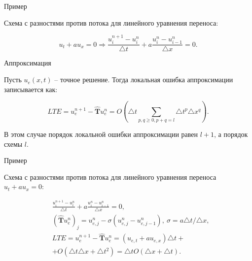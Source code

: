 \documentclass[10pt,xcolor=pst,aspectratio=169]{beamer}
\begin{document}
\begin{frame}{Пример}

    \transdissolve[duration=0.1]
    \justifying
    \large

    Схема с разностями против потока для линейного уравнения переноса:

    \[
        u_{t} + a u_{x} = 0 \Rightarrow \frac{u^{n + 1}_{i} - u^{n}_{i}}{\triangle t} + a \frac{u^{n}_{i} - u^{n}_{i - 1}}{\triangle x} = 0.
    \]    

\end{frame}

\begin{frame}{Аппроксимация}

	\transdissolve[duration=0.1]
	\justifying
	\large

	Пусть $u_{e} (x, t)$ -- точное решение. Тогда локальная ошибка аппроксимации записывается как:

	\[
		LTE = u^{n + 1}_{e} - \hat{\textbf{T}} u^{n}_{e} = O \left( \triangle t \sum_{p , q \geq 0, p + q = l} \triangle t^{p} \triangle x^{q} \right).
	\]

	В этом случае порядок локальной ошибки аппроксимации равен $l + 1$, а порядок схемы $l$.

\end{frame}

\begin{frame}{Пример}

	\transdissolve[duration=0.1]
	\justifying
	\large

	Схема с разностями против потока для линейного уравнения переноса $u_{t} + a u_{x} = 0$:

	\[
		\begin{split}
			&\frac{u^{n + 1}_{i} - u^{n}_{i}}{\triangle t} + a \frac{u^{n}_{i} - u^{n}_{i - 1}}{\triangle x} = 0, \\
			&\left( \hat{\textbf{T}} u^{n}_{e} \right)_{j} = u^{n}_{e, j} - \sigma \left( u^{n}_{e, j} - u^{n}_{e, j - 1} \right), \: \sigma = a \triangle t / \triangle x, \\
			&LTE = u^{n + 1}_{e} - \hat{\textbf{T}} u^{n}_{e} = \left( u_{e, t} + a u_{e, x} \right) \triangle t +\\
			& + O \left( \triangle t \triangle x + \triangle t^{2} \right) = \triangle t O \left( \triangle x + \triangle t \right).
		\end{split}
	\]

\end{frame}
\end{document}
